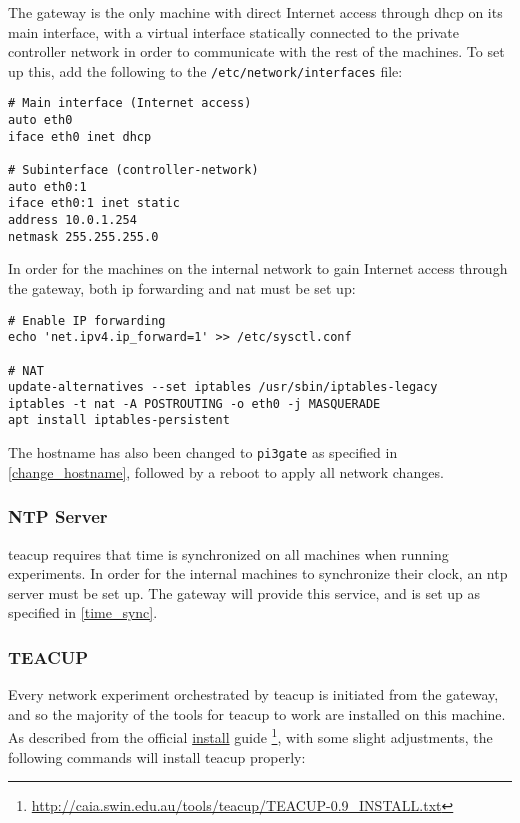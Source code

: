 The gateway is the only machine with direct Internet access through \gls{dhcp} on its main interface, with a virtual interface statically connected to the private controller network in order to communicate with the rest of the machines. To set up this, add the following to the \lstinline{/etc/network/interfaces} file:

\begin{verbatim}
# Main interface (Internet access)
auto eth0
iface eth0 inet dhcp

# Subinterface (controller-network)
auto eth0:1
iface eth0:1 inet static
address 10.0.1.254
netmask 255.255.255.0
\end{verbatim}

In order for the machines on the internal network to gain Internet access through the gateway, both \gls{ip} forwarding and \gls{nat} must be set up:

\begin{verbatim}
# Enable IP forwarding
echo 'net.ipv4.ip_forward=1' >> /etc/sysctl.conf

# NAT
update-alternatives --set iptables /usr/sbin/iptables-legacy
iptables -t nat -A POSTROUTING -o eth0 -j MASQUERADE
apt install iptables-persistent
\end{verbatim}

The hostname has also been changed to \lstinline{pi3gate} as specified in \ref{change_hostname}, followed by a reboot to apply all network changes.


\subsubsection{NTP Server}

\gls{teacup} requires that time is synchronized on all machines when running experiments. In order for the internal machines to synchronize their clock, an \gls{ntp} server must be set up. The gateway will provide this service, and is set up as specified in \ref{time_sync}.


\subsubsection{TEACUP} \label{teacup_gateway}

Every network experiment orchestrated by \gls{teacup} is initiated from the gateway, and so the majority of the tools for \gls{teacup} to work are installed on this machine. As described from the official \href{http://caia.swin.edu.au/tools/teacup/TEACUP-0.9_INSTALL.txt}{install} guide \footnote{\url{http://caia.swin.edu.au/tools/teacup/TEACUP-0.9_INSTALL.txt}}, with some slight adjustments, the following commands will install \gls{teacup} properly:

